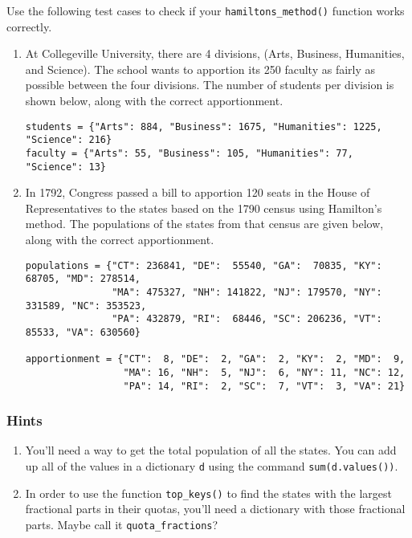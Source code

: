 \documentclass[12pt]{article}
\begin{document}
Use the following test cases to check if your \verb|hamiltons_method()| function works correctly.  
\begin{enumerate}
\item At Collegeville University, there are 4 divisions, (Arts, Business, Humanities, and Science). The school wants to apportion its 250 faculty as fairly as possible between the four divisions.  The number of students per division is shown below, along with the correct apportionment.
{\footnotesize
\begin{verbatim}
students = {"Arts": 884, "Business": 1675, "Humanities": 1225, "Science": 216}
faculty = {"Arts": 55, "Business": 105, "Humanities": 77, "Science": 13}
\end{verbatim}
}

\item In 1792, Congress passed a bill to apportion 120 seats in the House of Representatives to the states based on the 1790 census using Hamilton's method.  The populations of the states from that census are given below, along with the correct apportionment.  

{\footnotesize
\begin{verbatim}
populations = {"CT": 236841, "DE":  55540, "GA":  70835, "KY":  68705, "MD": 278514, 
               "MA": 475327, "NH": 141822, "NJ": 179570, "NY": 331589, "NC": 353523, 
               "PA": 432879, "RI":  68446, "SC": 206236, "VT":  85533, "VA": 630560}

apportionment = {"CT":  8, "DE":  2, "GA":  2, "KY":  2, "MD":  9, 
                 "MA": 16, "NH":  5, "NJ":  6, "NY": 11, "NC": 12, 
                 "PA": 14, "RI":  2, "SC":  7, "VT":  3, "VA": 21}
\end{verbatim}
}

\end{enumerate}

\subsubsection*{Hints}

\begin{enumerate}
\item You'll need a way to get the total population of all the states.  You can add up all of the values in a dictionary \verb|d| using the command \verb|sum(d.values())|.

\item In order to use the function \verb|top_keys()| to find the states with the largest fractional parts in their quotas, you'll need a dictionary with those fractional parts.  Maybe call it \verb|quota_fractions|?  %
\end{enumerate}
\end{document}
